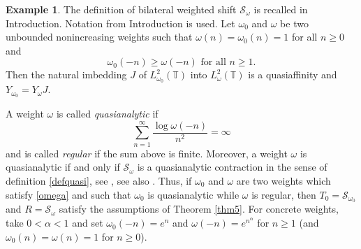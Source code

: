 \documentclass[a4paper,oneside,11pt]{amsart}
\numberwithin{equation}{section}
\theoremstyle{plain}
\theoremstyle{definition}
\newtheorem{example}[theorem]{Example}
\begin{document}
\begin{example}\label{exaweight}
The definition of bilateral weighted shift $\mathcal S_\omega$  is recalled in Introduction. 
 Notation from Introduction is used.  
Let $\omega_0$ and $\omega$ be two unbounded nonincreasing weights such that $\omega(n)=\omega_0(n)=1$ for all $n\geq 0$ and 
\begin{equation}\label{omega}\omega_0(-n)\geq\omega(-n) \text{   for all } n\geq1.\end{equation} 
Then the natural imbedding $J$ of $L^2_{\omega_0}(\mathbb T)$ into $L^2_\omega(\mathbb T)$ is a quasiaffinity and 
$Y_{\omega_0}=Y_\omega J$. 

A weight $\omega$ is called \emph{quasianalytic} if 
$$ \sum_{n=1}^\infty\frac{\log\omega(-n)}{n^2}=\infty$$
 and is called \emph{regular} if the sum above is finite. 
Moreover,  a  weight $\omega$ is quasianalytic if and only if  $\mathcal S_\omega$ is a quasianalytic contraction 
in the sense of definition \eqref{defquasi}, see {\cite[Propositon 31]{kersz}}, see also {\cite[Sec. 4]{est}}. 
Thus, if  $\omega_0$ and $\omega$ are two  weights which satisfy \eqref{omega} and such that $\omega_0$ is quasianalytic while $\omega$ 
is regular, then $T_0=\mathcal S_{\omega_0}$ and $R=\mathcal S_\omega$ satisfy  the assumptions of Theorem \ref{thm5}. 
For concrete weights, take  $0<\alpha<1$ and set $\omega_0(-n)=e^n$ and 
$\omega(-n)=e^{n^\alpha}$ for $n\geq 1$ (and $\omega_0(n)=\omega(n)=1$ for $n\geq 0$). 
\end{example}
\end{document}
